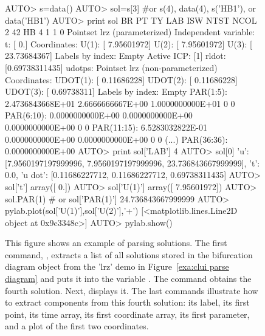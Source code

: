 \documentclass[12pt]{report}
\begin{document}
 \begin{figure}[htbp]
 {\small \begin{center} \begin{boxedverbatim}
 AUTO> s=data()
 AUTO> sol=s[3] #or s(4), data(4), s('HB1'), or data('HB1')
 AUTO> print sol 
   BR    PT  TY  LAB ISW NTST NCOL
    2    42  HB    4   1    1    0
 Pointset lrz (parameterized)
 Independent variable:
 t:  [ 0.]
 Coordinates:
 U(1):  [ 7.95601972]
 U(2):  [ 7.95601972]
 U(3):  [ 23.73684367]
 Labels by index: Empty
 Active ICP: [1]
 rldot: [0.69738311435]
 udotps: Pointset lrz (non-parameterized)
 Coordinates:
 UDOT(1):  [ 0.11686228]
 UDOT(2):  [ 0.11686228]
 UDOT(3):  [ 0.69738311]
 Labels by index: Empty
 PAR(1:5):      2.4736843668E+01   2.6666666667E+00   1.0000000000E+01   0   0
 PAR(6:10):     0.0000000000E+00   0.0000000000E+00   0.0000000000E+00   0   0
 PAR(11:15):    6.5283032822E-01   0.0000000000E+00   0.0000000000E+00   0   0
(...)
 PAR(36:36):    0.0000000000E+00
 AUTO> print sol['LAB']
 4
 AUTO> sol[0]
 {'u': [7.9560197197999996, 7.9560197197999996, 23.736843667999999],
   't': 0.0, 'u dot': [0.11686227712, 0.11686227712, 0.69738311435]}
 AUTO> sol['t']
 array([ 0.])
 AUTO> sol['U(1)']
 array([ 7.95601972])
 AUTO> sol.PAR(1) # or sol['PAR(1)']
 24.736843667999999
 AUTO> pylab.plot(sol['U(1)'],sol['U(2)'],'+')
 [<matplotlib.lines.Line2D object at 0x9c3348c>]
 AUTO> pylab.show()
 \end{boxedverbatim}
 \end{center} 
 }
 \caption[An example of parsing solutions.]
 {This figure shows an example of parsing solutions.
 The first command, , extracts a list of all solutions
 stored in the bifurcation diagram object  from the
 'lrz' demo in Figure~\ref{exa:clui parse diagram}
 and puts it into the variable .
 The command  obtains the fourth solution.
 Next,  displays it.
 The last commands illustrate how to extract components from
 this fourth solution: its label, its first point, its time array, its first
 coordinate array, its first parameter, and a plot of the first two
 coordinates.
 }
 \label{exa:clui parse solution}
 \end{figure}
\end{document}
